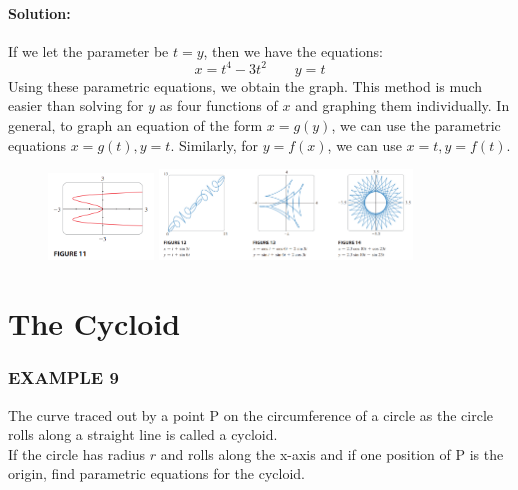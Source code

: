 \documentclass{article}
\begin{document}
\paragraph{Solution:} If we let the parameter be $t=y$, then we have the equations:
\[
x = t^4 - 3t^2 \qquad y=t
\]
Using these parametric equations, we obtain the graph. This method is much easier than solving for $y$ as four functions of $x$ and graphing them individually. In general, to graph an equation of the form $x=g(y)$, we can use the parametric equations $x=g(t), y=t$. Similarly, for $y=f(x)$, we can use $x=t, y=f(t)$.
\begin{figure}[htbp]
    \centering
    \includegraphics[width=0.25\textwidth]{graph25.png}
    \includegraphics[width=0.6\textwidth]{graph26.png}  %
\end{figure}

\section*{The Cycloid}
\subsubsection*{EXAMPLE 9}
The curve traced out by a point P on the circumference of a circle as the circle rolls along a straight line is called a cycloid. 
\\If the circle has radius $r$ and rolls along the x-axis and if one position of P is the origin, find parametric equations for the cycloid.
\end{document}
